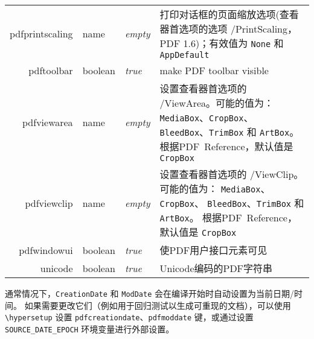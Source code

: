 \documentclass{article}
\begin{document}
\begin{longtable}{@{}>{\ttfamily}r>{\raggedright}p{}>{\itshape}lp{7cm}@{}}
  pdfprintscaling     & name           & empty                     & 打印对话框的页面缩放选项(查看器首选项的选项 /PrintScaling，PDF 1.6)；有效值为 \verb|None| 和 \verb|AppDefault|                                                                                                                                           \\
  pdftoolbar          & boolean        & true                      & make PDF toolbar visible                                                                                                                                                                                                     \\
  pdfviewarea         & name           & empty                     & 设置查看器首选项的 /ViewArea。可能的值为：
  \verb|MediaBox|、\verb|CropBox|、
  \verb|BleedBox|、\verb|TrimBox| 和 \verb|ArtBox|。
  根据PDF~Reference，默认值是 \verb|CropBox|                                                                                                                                                                                                                                                             \\
  pdfviewclip         & name           & empty                     & 设置查看器首选项的 /ViewClip。可能的值为：
  \verb|MediaBox|、\verb|CropBox|、
  \verb|BleedBox|、\verb|TrimBox| 和 \verb|ArtBox|。
  根据PDF~Reference，默认值是 \verb|CropBox|                                                                                                                                                                                                                                                             \\
  pdfwindowui         & boolean        & true                      & 使PDF用户接口元素可见                                                                                                                                                                                                                 \\
  unicode             & boolean        & true                      & Unicode编码的PDF字符串                                                                                                                                                                                                             \\
\end{longtable}

通常情况下，\verb|CreationDate| 和 \verb|ModDate| 会在编译开始时自动设置为当前日期/时间。
如果需要更改它们（例如用于回归测试以生成可重现的文档），可以使用 \verb|\hypersetup| 设置 \verb|pdfcreationdate|、\verb|pdfmoddate| 键，或通过设置 \verb|SOURCE_DATE_EPOCH| 环境变量进行外部设置。
\end{document}
